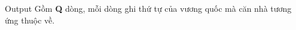 Output
Gồm   \textbf{    Q   }   dòng, mỗi dòng ghi thứ tự của vương quốc mà căn nhà tương ứng thuộc về.